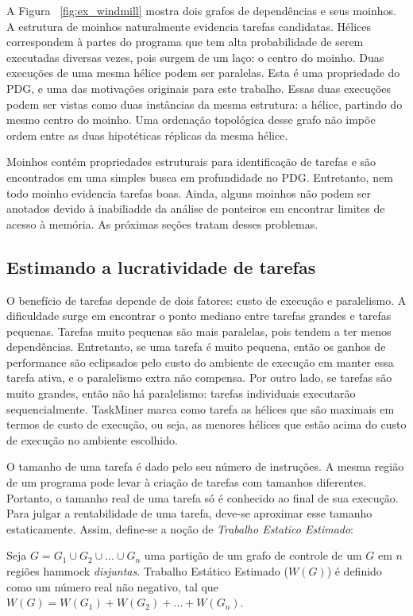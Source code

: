 \documentclass[sigplan,10pt,review]{acmart}
\newcommand\Taskminer{\mbox{\textsf{TaskMiner}}}
\begin{document}
A Figura ~\ref{fig:ex_windmill} mostra dois grafos de dependências e seus
moinhos. A estrutura de moinhos naturalmente evidencia tarefas candidatas.
Hélices correspondem à partes do programa que tem alta probabilidade de serem
executadas diversas vezes, pois surgem de um laço: o centro do moinho. Duas execuções
de uma mesma hélice podem ser paralelas. Esta é uma propriedade do PDG, e uma 
das motivações originais para este trabalho. Essas duas execuções podem ser vistas como duas instâncias
da mesma estrutura: a hélice, partindo do mesmo centro do moinho. 
Uma ordenação topológica desse grafo não impõe
ordem entre as duas hipotéticas réplicas da mesma hélice.

Moinhos contém propriedades estruturais para identificação de tarefas e são encontrados
em uma simples busca em profundidade no PDG. Entretanto, nem todo moinho
evidencia tarefas boas. Ainda, alguns moinhos não podem ser anotados devido à inabiliadde 
da análise de ponteiros em encontrar limites de acesso à memória. As próximas seções tratam desses
problemas.

\subsection{Estimando a lucratividade de tarefas}
\label{sub:profit}

O benefício de tarefas depende de dois fatores: custo de execução e paralelismo.
A dificuldade surge em encontrar o ponto mediano entre tarefas grandes e tarefas pequenas.
Tarefas muito pequenas são mais paralelas, pois tendem a ter menos dependências. 
Entretanto, se uma tarefa é muito pequena, 
então os ganhos de performance são eclipsados pelo custo do ambiente de execução
em manter essa tarefa ativa, e o paralelismo extra não compensa.
Por outro lado, se tarefas são muito grandes, então não há paralelismo: 
tarefas individuais executarão sequencialmente.
{\Taskminer} marca como tarefa as hélices que são maximais 
em termos de custo de execução, ou seja, as menores hélices
que estão acima do custo de execução no ambiente escolhido.

O tamanho de uma tarefa é dado pelo seu número de instruções. A mesma região de um programa
pode levar à criação de tarefas com tamanhos diferentes. 
Portanto, o tamanho real de uma tarefa só é conhecido ao final 
de sua execução. Para julgar a rentabilidade de uma tarefa,
deve-se aproximar esse tamanho
estaticamente. Assim, define-se a noção de {\em Trabalho Estatico Estimado}:

\begin{definition}
\label{def:swe}
Seja $G = G_1 \cup G_2 \cup \ldots \cup G_n$ uma partição de um grafo de controle
de um $G$ em $n$ regiões hammock {\em disjuntas}.
Trabalho Estático Estimado ($W(G)$) é definido como um número real não negativo,
tal que $W(G) = W(G_1) + W(G_2) + \ldots + W(G_n)$.
\end{definition}
\end{document}
